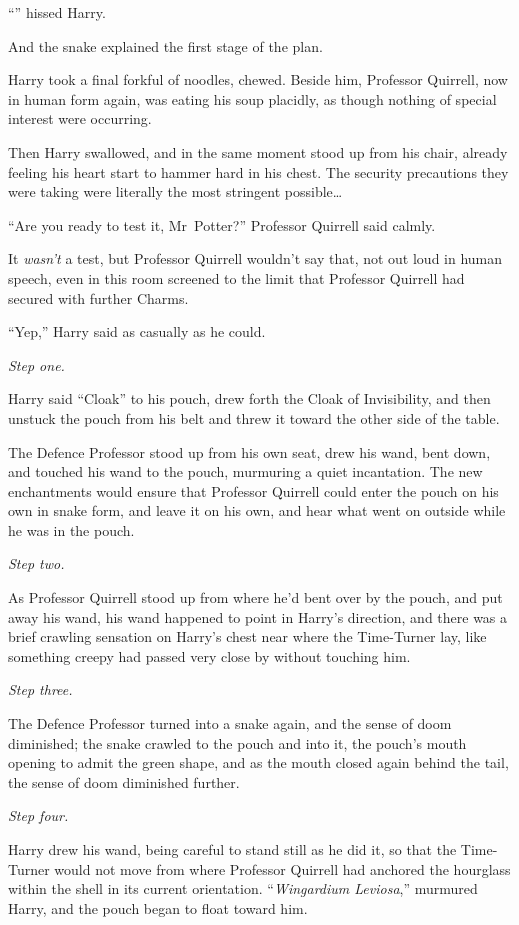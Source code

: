 “” hissed Harry.

And the snake explained the first stage of the plan.

\later

Harry took a final forkful of noodles, chewed. Beside him, Professor Quirrell, now in human form again, was eating his soup placidly, as though nothing of special interest were occurring.

Then Harry swallowed, and in the same moment stood up from his chair, already feeling his heart start to hammer hard in his chest. The security precautions they were taking were literally the most stringent possible…

“Are you ready to test it, Mr~Potter?” Professor Quirrell said calmly.

It \emph{wasn’t} a test, but Professor Quirrell wouldn’t say that, not out loud in human speech, even in this room screened to the limit that Professor Quirrell had secured with further Charms.

“Yep,” Harry said as casually as he could.

\emph{Step one.}

Harry said
“Cloak” to his pouch, drew forth the Cloak of Invisibility, and then unstuck the pouch from his belt and threw it toward the other side of the table.

The Defence Professor stood up from his own seat, drew his wand, bent down, and touched his wand to the pouch, murmuring a quiet incantation. The new enchantments would ensure that Professor Quirrell could enter the pouch on his own in snake form, and leave it on his own, and hear what went on outside while he was in the pouch.

\emph{Step two.}

As Professor Quirrell stood up from where he’d bent over by the pouch, and put away his wand, his wand happened to point in Harry’s direction, and there was a brief crawling sensation on Harry’s chest near where the Time-Turner lay, like something creepy had passed very close by without touching him.

\emph{Step three.}

The Defence Professor turned into a snake again, and the sense of doom diminished; the snake crawled to the pouch and into it, the pouch’s mouth opening to admit the green shape, and as the mouth closed again behind the tail, the sense of doom diminished further.

\emph{Step four.}

Harry drew his wand, being careful to stand still as he did it, so that the Time-Turner would not move from where Professor Quirrell had anchored the hourglass within the shell in its current orientation. “\emph{Wingardium Leviosa},” murmured Harry, and the pouch began to float toward him.

